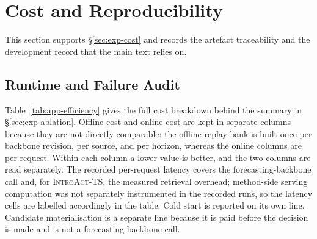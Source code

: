 \documentclass{article}
\newcommand{\introact}{\textsc{IntroAct-TS}}
\begin{document}
\section{Cost and Reproducibility}

This section supports \S\ref{sec:exp-cost} and records the artefact traceability and the
development record that the main text relies on.

\subsection{Runtime and Failure Audit}
\label{app:calls}
Table~\ref{tab:app-efficiency} gives the full cost breakdown behind the summary in
\S\ref{sec:exp-ablation}. Offline cost and online cost are kept in separate columns because
they are not directly comparable: the offline replay bank is built once per backbone revision,
per source, and per horizon, whereas the online columns are per request. Within each column a
lower value is better, and the two columns are read separately. The recorded per-request
latency covers the forecasting-backbone call and, for \introact{}, the measured retrieval
overhead; method-side serving computation was not separately instrumented in the recorded
runs, so the latency cells are labelled accordingly in the table. Cold start is
reported on its own line. Candidate materialisation is a separate line because it is paid
before the decision is made and is not a forecasting-backbone call.
\end{document}
